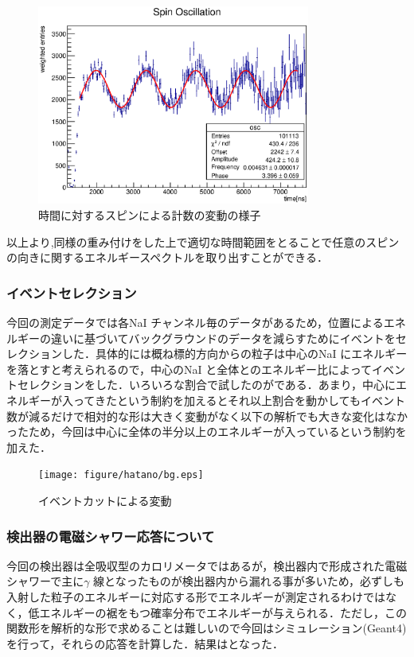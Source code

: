 \begin{figure}[hbt]
\centering
\includegraphics[width=0.8\textwidth]{figure/hatano/oscillation.eps}
\caption{時間に対するスピンによる計数の変動の様子}
\label{hatano_fig:oscillation}
\end{figure}

以上より,同様の重み付けをした上で適切な時間範囲をとることで任意のスピンの向きに関するエネルギースペクトルを取り出すことができる．

\subsubsection{イベントセレクション}
今回の測定データでは各NaI チャンネル毎のデータがあるため，位置によるエネルギーの違いに基づいてバックグラウンドのデータを減らすためにイベントをセレクションした．具体的には概ね標的方向からの粒子は中心のNaI にエネルギーを落とすと考えられるので，中心のNaI と全体とのエネルギー比によってイベントセレクションをした．いろいろな割合で試したのがである．あまり，中心にエネルギーが入ってきたという制約を加えるとそれ以上割合を動かしてもイベント数が減るだけで相対的な形は大きく変動がなく以下の解析でも大きな変化はなかったため，今回は中心に全体の半分以上のエネルギーが入っているという制約を加えた．

\begin{figure}[hbt]
\centering
\texttt{[image: figure/hatano/bg.eps]}
\caption{イベントカットによる変動}
\label{hatano_fig:bg}
\end{figure}

\subsubsection{検出器の電磁シャワー応答について}
今回の検出器は全吸収型のカロリメータではあるが，検出器内で形成された電磁シャワーで主に$\gamma$ 線となったものが検出器内から漏れる事が多いため，必ずしも入射した粒子のエネルギーに対応する形でエネルギーが測定されるわけではなく，低エネルギーの裾をもつ確率分布でエネルギーが与えられる．ただし，この関数形を解析的な形で求めることは難しいので今回はシミュレーション(Geant4)を行って，それらの応答を計算した．結果はとなった．

